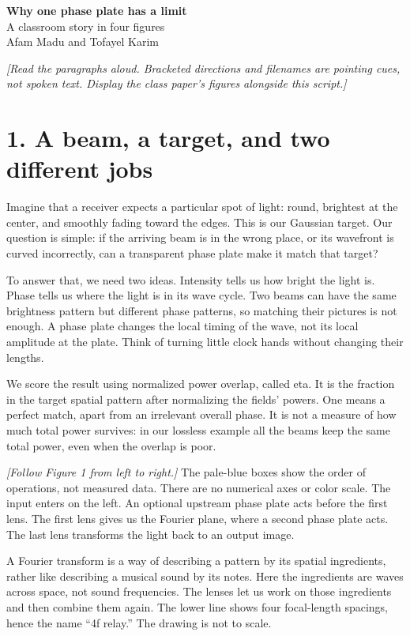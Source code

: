 \documentclass[11pt,a4paper]{article}
\newcommand{\cue}[1]{{\small\color{blue!55!black}\textit{[#1]}}}
\newcommand{\asset}[1]{{\small\texttt{\detokenize{#1}}}}
\begin{document}
\begin{center}
{\Large\bfseries Why one phase plate has a limit}\\[5pt]
{\large A classroom story in four figures}\\[4pt]
Afam Madu and Tofayel Karim
\end{center}
\cue{Read the paragraphs aloud. Bracketed directions and filenames are pointing cues, not spoken text. Display the class paper's figures alongside this script.}

\section*{1. A beam, a target, and two different jobs}
\asset{01_optical_schematic.png}

Imagine that a receiver expects a particular spot of light: round, brightest at the center, and smoothly fading toward the edges. This is our Gaussian target. Our question is simple: if the arriving beam is in the wrong place, or its wavefront is curved incorrectly, can a transparent phase plate make it match that target?

To answer that, we need two ideas. Intensity tells us how bright the light is. Phase tells us where the light is in its wave cycle. Two beams can have the same brightness pattern but different phase patterns, so matching their pictures is not enough. A phase plate changes the local timing of the wave, not its local amplitude at the plate. Think of turning little clock hands without changing their lengths.

We score the result using normalized power overlap, called eta. It is the fraction in the target spatial pattern after normalizing the fields' powers. One means a perfect match, apart from an irrelevant overall phase. It is not a measure of how much total power survives: in our lossless example all the beams keep the same total power, even when the overlap is poor.

\cue{Follow Figure 1 from left to right.}
The pale-blue boxes show the order of operations, not measured data. There are no numerical axes or color scale. The input enters on the left. An optional upstream phase plate acts before the first lens. The first lens gives us the Fourier plane, where a second phase plate acts. The last lens transforms the light back to an output image.

A Fourier transform is a way of describing a pattern by its spatial ingredients, rather like describing a musical sound by its notes. Here the ingredients are waves across space, not sound frequencies. The lenses let us work on those ingredients and then combine them again. The lower line shows four focal-length spacings, hence the name ``4f relay.'' The drawing is not to scale.
\end{document}
